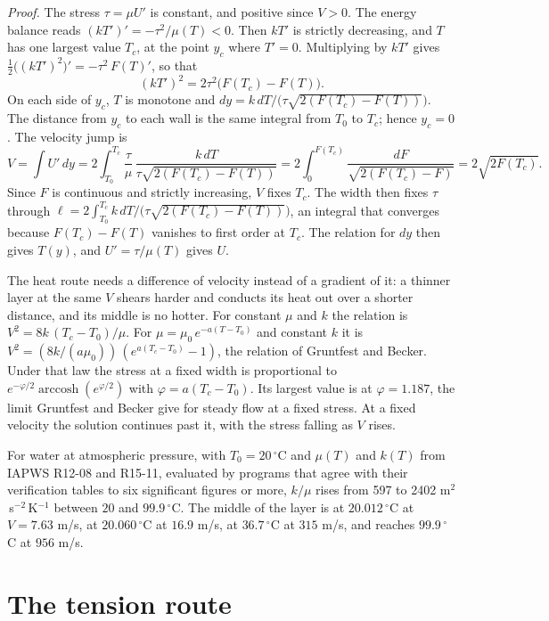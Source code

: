 \emph{Proof.} The stress $\tau = \mu U'$ is constant, and positive since $V > 0$. The energy
balance reads $(kT')' = -\tau^2/\mu(T) < 0$. Then $kT'$ is strictly decreasing, and $T$ has one
largest value $T_c$, at the point $y_c$ where $T' = 0$. Multiplying by $kT'$ gives
$\tfrac12\big((kT')^2\big)' = -\tau^2\,F(T)'$, so that
\[
(kT')^2 = 2\tau^2\big(F(T_c) - F(T)\big).
\]
On each side of $y_c$, $T$ is monotone and $dy = k\,dT/\big(\tau\sqrt{2(F(T_c) - F(T))}\big)$. The
distance from $y_c$ to each wall is the same integral from $T_0$ to $T_c$; hence $y_c = 0$. The
velocity jump is
\[
V = \int U'\,dy = 2\int_{T_0}^{T_c}\frac{\tau}{\mu}\,
\frac{k\,dT}{\tau\sqrt{2(F(T_c) - F(T))}} = 2\int_0^{F(T_c)}\frac{dF}{\sqrt{2(F(T_c) - F)}}
= 2\sqrt{2F(T_c)} .
\]
Since $F$ is continuous and strictly increasing, $V$ fixes $T_c$. The width then fixes $\tau$
through $\ell = 2\int_{T_0}^{T_c} k\,dT/\big(\tau\sqrt{2(F(T_c)-F(T))}\big)$, an integral that
converges because $F(T_c) - F(T)$ vanishes to first order at $T_c$. The relation for $dy$ then
gives $T(y)$, and $U' = \tau/\mu(T)$ gives $U$. \hfill\qedsymbol

The heat route needs a difference of velocity instead of a gradient of it: a thinner layer at the same
$V$ shears harder and conducts its heat out over a shorter distance, and its middle is no hotter.
For constant $\mu$ and $k$ the relation is $V^2 = 8k\,(T_c - T_0)/\mu$. For
$\mu = \mu_0\,e^{-a(T-T_0)}$ and constant $k$ it is
$V^2 = (8k/(a\mu_0))\,(e^{a(T_c - T_0)} - 1)$, the relation of Gruntfest and Becker. Under that law
the stress at a fixed width is proportional to $e^{-\varphi/2}\operatorname{arccosh}(e^{\varphi/2})$
with $\varphi = a(T_c - T_0)$. Its largest value is at $\varphi = 1.187$, the limit Gruntfest and
Becker give for steady flow at a fixed stress. At a fixed velocity the solution continues past it,
with the stress falling as $V$ rises.

For water at atmospheric pressure, with $T_0 = 20\,^\circ$C and $\mu(T)$ and $k(T)$ from IAPWS
R12-08 and R15-11, evaluated by programs that agree with their verification tables to six
significant figures or more, $k/\mu$ rises
from 597 to 2402 m$^2$\,s$^{-2}$\,K$^{-1}$ between $20$ and $99.9\,^\circ$C. The middle of the layer
is at $20.012\,^\circ$C at $V = 7.63$ m/s, at $20.060\,^\circ$C at $16.9$ m/s, at
$36.7\,^\circ$C at $315$ m/s, and reaches $99.9\,^\circ$C at $956$ m/s.

\section{The tension route}

